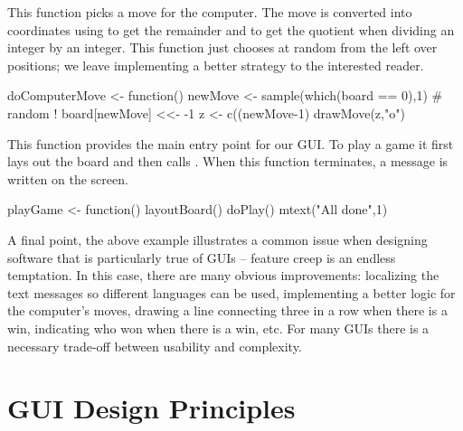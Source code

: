 This function picks a move for the computer.  The move is converted
into coordinates using \code{\%\%} to get the remainder and
\code{\%/\%} to get the quotient when dividing an integer by an
integer. This function just chooses at random from the left over
positions; we leave implementing a better strategy to the interested
reader.

\begin{Schunk}
\begin{Sinput}
 doComputerMove <- function() {
   newMove <- sample(which(board == 0),1) # random !
   board[newMove] <<- -1    
   z <- c((newMove-1) %
   drawMove(z,"o")
 }
\end{Sinput}
\end{Schunk}


This function provides the main entry point for our GUI. To play a
game it first lays out the board and then calls
. When this function terminates, a message is written
on the screen.
\begin{Schunk}
\begin{Sinput}
 playGame <- function() {
   layoutBoard()
   doPlay()
   mtext("All done\n",1)
 }
\end{Sinput}
\end{Schunk}

A final point, the above example illustrates a common issue when designing
software that is particularly true of GUIs -- feature creep is an
endless temptation. In this case, there are many obvious improvements:
localizing the text messages so different languages can be used,
implementing a better logic for the computer's moves, drawing a line
connecting three in a row when there is a win, indicating who won when
there is a win, etc. For many GUIs there is a necessary trade-off
between usability and complexity.

\section{GUI Design Principles}
\label{sec:GUI:design}




